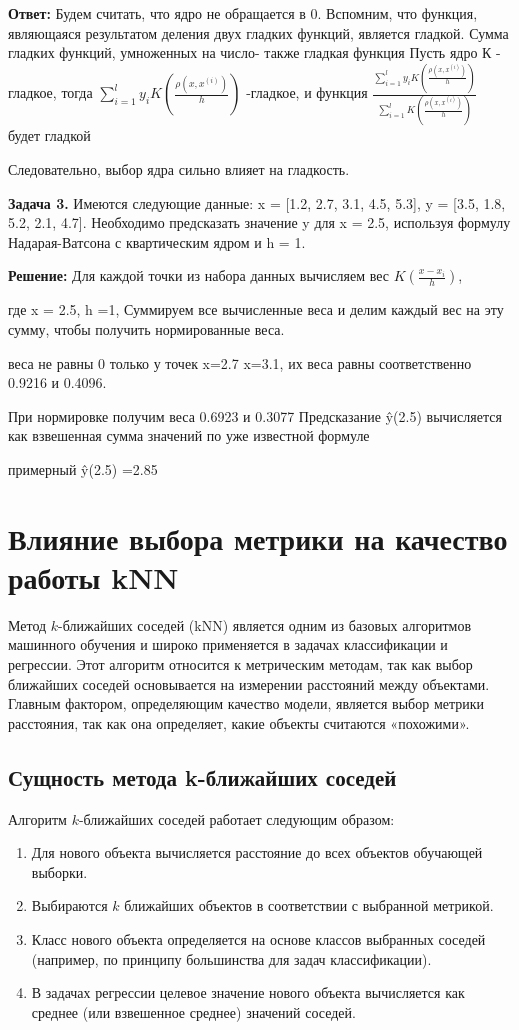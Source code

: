 \textbf{Ответ:}
Будем считать, что ядро не обращается в 0.
Вспомним, что функция, являющаяся результатом деления двух гладких функций, является гладкой.
Сумма гладких функций, умноженных на число- также гладкая функция
Пусть ядро К - гладкое, тогда ${\sum\limits_{i=1}^ly_iK\left(\frac{\rho(x, x^{(i)})}{h}\right)}$ -гладкое, и функция
$\frac{\sum\limits_{i=1}^ly_iK\left(\frac{\rho(x, x^{(i)})}{h}\right)}{\sum\limits_{i=1}^lK\left(\frac{\rho(x, x^{(i)})}{h}\right)}$
будет гладкой

Следовательно, выбор ядра сильно влияет на гладкость.

\textbf{Задача 3.} Имеются следующие данные: x = [1.2, 2.7, 3.1, 4.5, 5.3],  y = [3.5, 1.8, 5.2, 2.1, 4.7].  Необходимо предсказать значение y для x = 2.5, используя формулу Надарая-Ватсона с квартическим ядром и h = 1.


\textbf{Решение:} Для каждой точки из набора данных вычисляем вес $K(\frac{x-x_i}{h})$,

где x = 2.5, h =1,
Суммируем все вычисленные веса и делим каждый вес на эту сумму, чтобы получить нормированные веса.

веса не равны 0 только у точек x=2.7 x=3.1, их веса равны соответственно 0.9216 и 0.4096.

При нормировке получим веса 0.6923 и 0.3077
Предсказание ŷ(2.5) вычисляется как взвешенная сумма значений по уже известной формуле

примерный ŷ(2.5) =2.85


\section{Влияние выбора метрики на качество работы kNN}

Метод \(k\)-ближайших соседей (kNN) является одним из базовых алгоритмов машинного обучения и широко применяется в задачах классификации и регрессии. Этот алгоритм относится к метрическим методам, так как выбор ближайших соседей основывается на измерении расстояний между объектами. Главным фактором, определяющим качество модели, является выбор метрики расстояния, так как она определяет, какие объекты считаются «похожими».

\subsection{Сущность метода k-ближайших соседей}

Алгоритм \(k\)-ближайших соседей работает следующим образом:
\begin{enumerate}
    \item Для нового объекта вычисляется расстояние до всех объектов обучающей выборки.
    \item Выбираются \(k\) ближайших объектов в соответствии с выбранной метрикой.
    \item Класс нового объекта определяется на основе классов выбранных соседей (например, по принципу большинства для задач классификации).
    \item В задачах регрессии целевое значение нового объекта вычисляется как среднее (или взвешенное среднее) значений соседей.
\end{enumerate}

